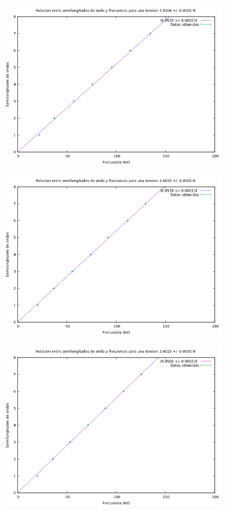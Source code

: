 \documentclass[10pt,a4paper]{article}
\begin{document}
\begin{figure}[H]
\includegraphics[scale=0.65]{2.png}
\centering
\end{figure}

\begin{figure}[H]
\includegraphics[scale=0.65]{3.png}
\centering
\end{figure}

\begin{figure}[H]
\includegraphics[scale=0.65]{4.png}
\centering
\end{figure}
\end{document}
